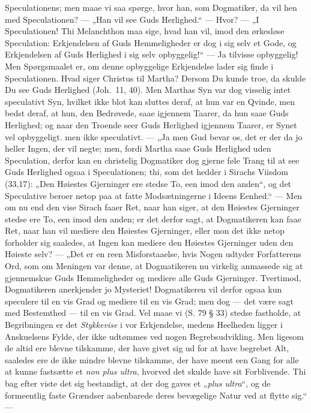 Speculationens; men maae vi saa spørge, hvor han, som Dogmatiker,
da vil hen med Speculationen? --- „Han vil see Guds Herlighed.“
--- Hvor? --- „I Speculationen! Thi Melanchthon maa sige, hvad han
vil, imod den ørkesløse Speculation: Erkjendelsen af Guds
Hemmeligheder er dog i sig selv et Gode, og Erkjendelsen af Guds
Herlighed i sig selv opbyggelig!“ --- Ja tilvisse opbyggelig! Men
Spørgsmaalet er, om denne opbyggelige Erkjendelse lader sig finde
i Speculationen. Hvad siger Christus til Martha? Dersom Du kunde
troe, da skulde Du see Guds Herlighed (Joh.\ 11, 40). Men Marthas
Syn var dog visselig intet speculativt Syn, hvilket ikke blot kan
sluttes deraf, at hun var en Qvinde, men bedst deraf, at hun, den
Bedrøvede, saae igjennem Taarer, da hun saae Guds Herlighed; og
naar den Troende seer Guds Herlighed igjennem Taarer, er Synet vel
opbyggeligt. men ikke speculativt. --- „Ja men Gud bevar os, det
er der da jo heller Ingen, der vil negte; men, fordi Martha saae
Guds Herlighed uden Speculation, derfor kan en christelig
Dogmatiker dog gjerne føle Trang til at see Guds Herlighed ogsaa i
Speculationen; thi, som det hedder i Sirachs Viisdom (33,17):
„Den Høiestes Gjerninger ere stedse To, een imod den anden“, og
det Speculative beroer netop paa at fatte Modsætningerne i Ideens
Eenhed.“ --- Men om nu end den vise Sirach faaer Ret, naar han
siger, at den Høiestes Gjerninger stedse ere To, een imod den
anden;
 er det derfor sagt, at Dogmatikeren kan faae Ret, naar han vil
mediere den Høiestes Gjerninger, eller mon det ikke netop
forholder sig saaledes, at Ingen kan mediere den Høiestes
Gjerninger uden den Høieste selv? --- „Det er en reen
Misforstaaelse, hvis Nogen udtyder Forfatterens Ord, som om
Meningen var denne, at Dogmatikeren nu virkelig anmassede sig at
gjennemskue Guds Hemmeligheder og mediere alle Guds Gjerninger.
Tvertimod, Dogmatikeren anerkjender jo Mysteriet! Dogmatikeren vil
derfor ogsaa kun speculere til en vis Grad og mediere til en vis
Grad; men dog --- det være sagt med Bestemthed --- til en vis
Grad. Vel maae vi (S. 79 § 33) stedse fastholde, at Begribningen
er det \emph{Stykkevise} i vor Erkjendelse, medens Heelheden
ligger i Anskuelsens Fylde, der ikke udtømmes ved nogen
Begrebsudvikling. Men ligesom de altid ere blevne tilskamme, der
have givet sig ud for at have begrebet Alt, saaledes ere de ikke
mindre blevne tilskamme, der have meent een Gang for alle at kunne
fastsætte et \textit{non plus ultra}, hvorved det skulde have sit
Forblivende. Thi bag efter viste det sig bestandigt, at der dog
gaves et „\textit{plus ultra}“, og de formeentlig faste Grændser
aabenbarede deres bevægelige Natur ved at flytte sig.“ ---

